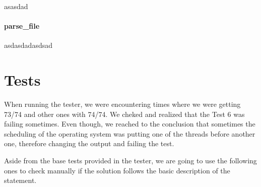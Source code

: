 \documentclass[es]{uc3mreport}
\begin{document}
\begin{report}
      \setcounter{subsubsection}{0}

      asasdad

      \subsection{parse\_file\(\)}

      \setcounter{subsubsection}{0}

      asdasdadasdsad

      \part{Tests}

      \setcounter{section}{0}

      \setcounter{subsection}{0}

      \setcounter{subsubsection}{0}

      When running the tester, we were encountering times where we were
      getting 73/74 and other ones with 74/74. We cheked and realized
      that the Test 6 was failing sometimes. Even though, we reached to
      the conclusion that sometimes the scheduling of the operating
      system was putting one of the threads before another one,
      therefore changing the output and failing the test.

      Aside from the base tests provided in the tester, we are going to
      use the following ones to check manually if the solution follows
      the basic description of the statement.


\end{report}
\end{document}
